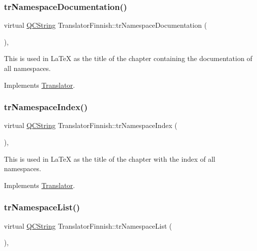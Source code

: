 \subsubsection{\texorpdfstring{trNamespaceDocumentation()}{trNamespaceDocumentation()}}
{\footnotesize\ttfamily virtual \mbox{\hyperlink{class_q_c_string}{Q\+C\+String}} Translator\+Finnish\+::tr\+Namespace\+Documentation (\begin{DoxyParamCaption}{ }\end{DoxyParamCaption})\hspace{0.3cm}{\ttfamily [inline]}, {\ttfamily [virtual]}}

This is used in La\+TeX as the title of the chapter containing the documentation of all namespaces. 

Implements \mbox{\hyperlink{class_translator}{Translator}}.

\mbox{\label{class_translator_finnish_a3753277ae4aefad0989529b1f3c71e07}} 
\subsubsection{\texorpdfstring{trNamespaceIndex()}{trNamespaceIndex()}}
{\footnotesize\ttfamily virtual \mbox{\hyperlink{class_q_c_string}{Q\+C\+String}} Translator\+Finnish\+::tr\+Namespace\+Index (\begin{DoxyParamCaption}{ }\end{DoxyParamCaption})\hspace{0.3cm}{\ttfamily [inline]}, {\ttfamily [virtual]}}

This is used in La\+TeX as the title of the chapter with the index of all namespaces. 

Implements \mbox{\hyperlink{class_translator}{Translator}}.

\mbox{\label{class_translator_finnish_a7edb3d519add51af7620cfba7c8f19d6}} 
\subsubsection{\texorpdfstring{trNamespaceList()}{trNamespaceList()}}
{\footnotesize\ttfamily virtual \mbox{\hyperlink{class_q_c_string}{Q\+C\+String}} Translator\+Finnish\+::tr\+Namespace\+List (\begin{DoxyParamCaption}{ }\end{DoxyParamCaption})\hspace{0.3cm}{\ttfamily [inline]}, {\ttfamily [virtual]}}

